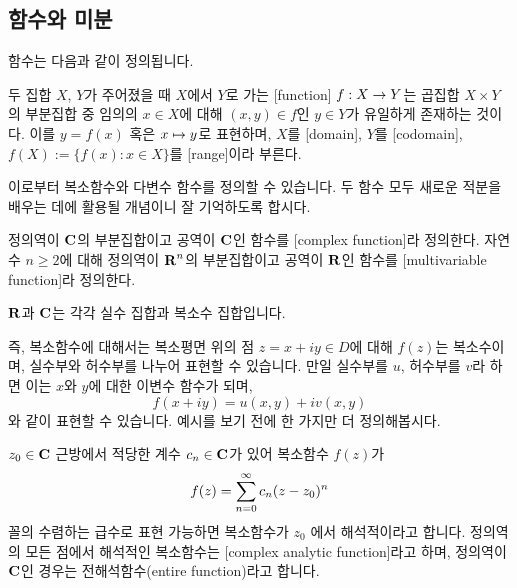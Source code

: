 \documentclass[11pt]{book}
\begin{document}
\subsection{함수와 미분}
\begin{MLPar}
함수는 다음과 같이 정의됩니다.
\end{MLPar}

\begin{MLDef}[함수와 관련 정의]
두 집합 \(X\), \(Y\)가 주어졌을 때 \(X\)에서 \(Y\)로 가는 [function] \(f:X \rightarrow Y\)는 곱집합 \(X \times Y\)의 부분집합 중 임의의 \(x\in X\)에 대해 \((x, y)\in f\)인 \(y\in Y\)가 유일하게 존재하는 것이다.
이를 \(y = f(x)\) 혹은 \(x \mapsto y\)로 표현하며, \(X\)를 [domain], \(Y\)를 [codomain], \(f(X) := \{f(x): x\in X\}\)를 [range]이라 부른다.
\end{MLDef}

\begin{MLPar}
이로부터 복소함수와 다변수 함수를 정의할 수 있습니다.
두 함수 모두 새로운 적분을 배우는 데에 활용될 개념이니 잘 기억하도록 합시다.
\end{MLPar}

\begin{MLDef}
정의역이 \(\mbox{$\mathbf C$}\)의 부분집합이고 공역이 \(\mbox{$\mathbf C$}\)인 함수를 [complex function]라 정의한다.
자연수 \(n\ge 2\)에 대해 정의역이 \(\mbox{$\mathbf R$}^n\)의 부분집합이고 공역이 \(\mbox{$\mathbf R$}\)인 함수를 [multivariable function]라 정의한다.%

\remark \(\mbox{$\mathbf R$}\)과 \(\mbox{$\mathbf C$}\)는 각각 실수 집합과 복소수 집합입니다.
\end{MLDef}

\begin{MLPar}
즉, 복소함수에 대해서는 복소평면 위의 점 \(z = x + iy \in D\)에 대해 \(f(z)\)는 복소수이며, 실수부와 허수부를 나누어 표현할 수 있습니다.
만일 실수부를 \(u\), 허수부를 \(v\)라 하면 이는 \(x\)와 \(y\)에 대한 이변수 함수가 되며, 
\[f(x+iy) = u(x, y) + iv(x, y)\]
와 같이 표현할 수 있습니다.
예시를 보기 전에 한 가지만 더 정의해봅시다.
\end{MLPar}

\begin{MLDef}[복소 해석함수]
\(z_0\in\mbox{$\mathbf C$}\) 근방에서 적당한 계수 \(c_n\in\mbox{$\mathbf C$}\)가 있어 복소함수 \(f(z)\)가
\[f(z) = \sum_{n=0}^{\infty}c_n(z-z_0)^n\]
꼴의 수렴하는 급수로 표현 가능하면 복소함수가 \(z_0\) 에서 해석적이라고 합니다.
정의역의 모든 점에서 해석적인 복소함수는 [complex analytic function]라고 하며, 정의역이 \(\mbox{$\mathbf C$}\)인 경우는 전해석함수{\small (entire function)}라고 합니다.
\end{MLDef}
\end{document}

